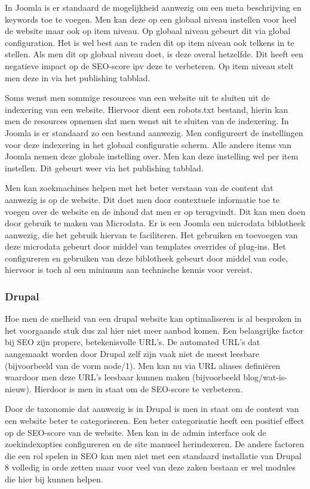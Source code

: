 In Joomla is er standaard de mogelijkheid aanwezig om een meta beschrijving en keywords toe te voegen. Men kan deze op een globaal niveau instellen voor heel de website maar ook op item niveau. Op globaal niveau gebeurt dit via global configuration. Het is wel best aan te raden dit op item niveau ook telkens in te stellen. Als men dit op globaal niveau doet, is deze overal hetzelfde. Dit heeft een negatieve impact op de SEO-score ipv deze te verbeteren. Op item niveau stelt men deze in via het publishing tabblad.

Soms wenst men sommige resources van een website uit te sluiten uit de indexering van een website. Hiervoor dient een robots.txt bestand, hierin kan men de resources opnemen dat men wenst uit te sluiten van de indexering. In Joomla is er standaard zo een bestand aanwezig. Men configureert de instellingen voor deze indexering in het globaal configuratie scherm. Alle andere items van Joomla nemen deze globale instelling over. Men kan deze instelling wel per item instellen. Dit gebeurt weer via het publishing tabblad.

Men kan zoekmachines helpen met het beter verstaan van de content dat aanwezig is op de website. Dit doet men door contextuele informatie toe te voegen over de website en de inhoud dat men er op terugvindt. Dit kan men doen door gebruik te maken van Microdata. Er is een Joomla een microdata biblotheek aanwezig, die het gebruik hiervan te faciliteren. Het gebruiken en toevoegen van deze microdata gebeurt door middel van templates overrides of plug-ins. Het configureren en gebruiken van deze biblotheek gebeurt door middel van code, hiervoor is toch al een minimum aan technische kennis voor vereist.
\subsubsection{Drupal}
Hoe men de snelheid van een drupal website kan optimaliseren is al besproken in het voorgaande stuk dus zal hier niet meer aanbod komen. Een belangrijke factor bij SEO zijn propere, betekenisvolle URL's. De automated URL's dat aangemaakt worden door Drupal zelf zijn vaak niet de meest leesbare (bijvoorbeeld van de vorm node/1). Men kan nu via URL aliases definiëren waardoor men deze URL's leesbaar kunnen maken (bijvoorbeeld blog/wat-is-nieuw). Hierdoor is men in staat om de SEO-score te verbeteren.

Door de taxonomie dat aanwezig is in Drupal is men in staat om de content van een website beter te categoriseren. Een beter categorisatie heeft een positief effect op de SEO-score van de website. Men kan in de admin interface ook de zoekindexopties configureren en de site manueel herindexeren. De andere factoren die een rol spelen in SEO kan men niet met een standaard installatie van Drupal 8 volledig in orde zetten maar voor veel van deze zaken bestaan er wel modules die hier bij kunnen helpen.
